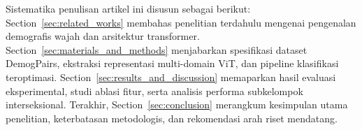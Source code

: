 Sistematika penulisan artikel ini disusun sebagai berikut: Section~\ref{sec:related_works} membahas penelitian terdahulu mengenai pengenalan demografis wajah dan arsitektur transformer. Section~\ref{sec:materials_and_methods} menjabarkan spesifikasi dataset DemogPairs, ekstraksi representasi multi-domain ViT, dan pipeline klasifikasi teroptimasi. Section~\ref{sec:results_and_discussion} memaparkan hasil evaluasi eksperimental, studi ablasi fitur, serta analisis performa subkelompok interseksional. Terakhir, Section~\ref{sec:conclusion} merangkum kesimpulan utama penelitian, keterbatasan metodologis, dan rekomendasi arah riset mendatang.
